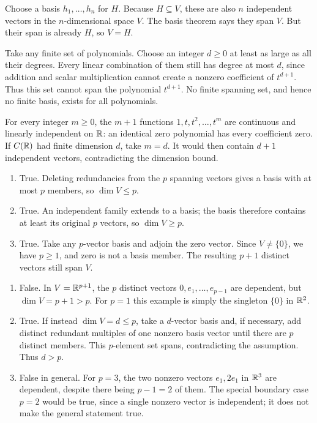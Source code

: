 Choose a basis $h_1,\ldots,h_n$ for $H$. Because $H\subseteq V$,
these are also $n$ independent vectors in the $n$-dimensional space $V$.
The basis theorem says they span $V$. But their span is already $H$,
so $V=H$.

Take any finite set of polynomials. Choose an integer $d\ge0$ at
least as large as all their degrees. Every linear combination of them
still has degree at most $d$, since addition and scalar multiplication
cannot create a nonzero coefficient of $t^{d+1}$. Thus this set cannot
span the polynomial $t^{d+1}$. No finite spanning set, and hence no
finite basis, exists for all polynomials.

For every integer $m\ge0$, the $m+1$ functions
$1,t,t^2,\ldots,t^m$ are continuous and linearly independent on $\mathbb{R}$:
an identical zero polynomial has every coefficient zero. If $C(\mathbb{R})$
had finite dimension $d$, take $m=d$. It would then contain $d+1$
independent vectors, contradicting the dimension bound.

\begin{enumerate}[label=(\alph*)]
\item True. Deleting redundancies from the $p$ spanning vectors gives
a basis with at most $p$ members, so $\dim V\le p$.
\item True. An independent family extends to a basis; the basis
therefore contains at least its original $p$ vectors, so $\dim V\ge p$.
\item True. Take any $p$-vector basis and adjoin the zero vector. Since
$V\ne\{0\}$, we have $p\ge1$, and zero is not a basis member.
The resulting $p+1$ distinct vectors still span $V$.
\end{enumerate}

\begin{enumerate}[label=(\alph*)]
\item False. In $V=\mathbb{R}^{p+1}$, the $p$ distinct vectors
$0,e_1,\ldots,e_{p-1}$ are dependent, but $\dim V=p+1>p$.
For $p=1$ this example is simply the singleton $\{0\}$ in $\mathbb{R}^2$.
\item True. If instead $\dim V=d\le p$, take a $d$-vector basis and,
if necessary, add distinct redundant multiples of one nonzero basis
vector until there are $p$ distinct members. This $p$-element set spans,
contradicting the assumption. Thus $d>p$.
\item False in general. For $p=3$, the two nonzero vectors $e_1,2e_1$
in $\mathbb{R}^3$ are dependent, despite there being $p-1=2$ of them.
The special boundary case $p=2$ would be true, since a single nonzero
vector is independent; it does not make the general statement true.
\end{enumerate}

